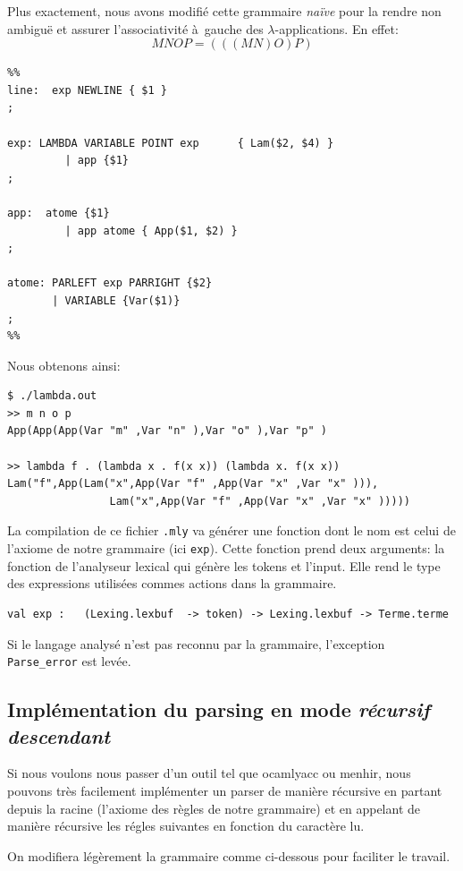 Plus exactement, nous avons modifié cette grammaire \textit{naïve} pour la
rendre non ambiguë et assurer l'associativité à gauche des
$\lambda$-applications.
En effet: 
$$ M N O P = (((M N) O) P) $$
\begin{Verbatim}
%% 
line:  exp NEWLINE { $1 }
;

exp: LAMBDA VARIABLE POINT exp		{ Lam($2, $4) }
		 | app {$1}
;

app:  atome {$1}
		 | app atome { App($1, $2) }
;

atome: PARLEFT exp PARRIGHT {$2}
       | VARIABLE {Var($1)}
;		
%%
\end{Verbatim}
Nous obtenons ainsi:
\begin{Verbatim}
$ ./lambda.out
>> m n o p
App(App(App(Var "m" ,Var "n" ),Var "o" ),Var "p" )

>> lambda f . (lambda x . f(x x)) (lambda x. f(x x))
Lam("f",App(Lam("x",App(Var "f" ,App(Var "x" ,Var "x" ))),
				Lam("x",App(Var "f" ,App(Var "x" ,Var "x" )))))
\end{Verbatim}



La compilation de ce fichier \verb+.mly+ va générer une fonction dont le nom
est celui de l'axiome de notre grammaire (ici \verb+exp+). Cette fonction prend deux arguments: la fonction de l'analyseur lexical qui génère les tokens et l'input. Elle rend le type
des expressions utilisées commes actions dans la grammaire.
\begin{Verbatim}
val exp :   (Lexing.lexbuf  -> token) -> Lexing.lexbuf -> Terme.terme
\end{Verbatim}

 Si le langage analysé n'est pas reconnu par la grammaire, l'exception \verb+Parse_error+ est levée.
 \subsection{Implémentation du parsing en mode \textit{récursif descendant}}
 
 Si nous voulons nous passer d'un outil tel que ocamlyacc ou menhir, nous pouvons très facilement implémenter un parser
 de manière récursive en partant depuis la racine (l'axiome des règles de notre grammaire) et en appelant de manière récursive les
 régles suivantes en fonction du caractère lu.
 
 On modifiera légèrement la grammaire comme ci-dessous pour faciliter le travail.
 
